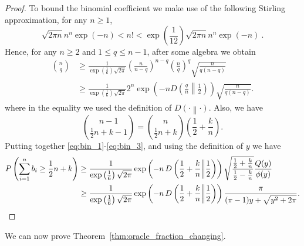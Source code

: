 \begin{proof}
To bound the binomial coefficient we make use of the following Stirling approximation, for any $n\geq 1$,
\[
\sqrt{2 \pi n} n^n \exp(-n) < n! < \exp\left(\frac{1}{12}\right)\sqrt{2 \pi n} n^n \exp(-n)~.
\]
Hence, for any $n \geq 2$ and $1\leq q \leq n-1$, after some algebra we obtain
\begin{align*}
{n \choose q} 
&\geq \frac{1}{\exp\left(\frac{1}{6}\right) \sqrt{2 \pi}} \left(\frac{n}{n-q}\right)^{n-q} \left(\frac{n}{q}\right)^{q} \sqrt{\frac{n}{q(n-q)}} \\
&\geq \frac{1}{\exp\left(\frac{1}{6}\right) \sqrt{2 \pi}} 2^n \exp\left(-n D\left(\frac{q}{n}\middle\|\frac{1}{2}\right)\right) \sqrt{\frac{n}{q(n-q)}}.
\end{align*}
where in the equality we used the definition of $D\left(\cdot\middle\|\cdot\right)$.
Also, we have
\begin{equation}
\label{eq:bin_3}
{n-1 \choose \frac{1}{2} n + k - 1} = {n \choose \frac{1}{2} n + k} \left(\frac{1}{2} + \frac{k}{n}\right) .
\end{equation}
Putting together \eqref{eq:bin_1}-\eqref{eq:bin_3}, and using the definition of $y$ we have
\begin{align*}
P\left( \sum_{i=1}^n b_i \geq \frac{1}{2} n + k \right) 
&\geq \frac{1}{\exp\left(\frac{1}{6}\right) \sqrt{2 \pi}} \exp\left(-n\, D\left(\frac{1}{2}+\frac{k}{n}\middle\|\frac{1}{2}\right)\right) \sqrt{\frac{\frac{1}{2} + \frac{k}{n}}{\frac{1}{2}-\frac{k}{n}}}  \frac{Q(y)}{\phi(y)} \\
&\geq \frac{1}{\exp\left(\frac{1}{6}\right) \sqrt{2 \pi}} \exp\left(-n\, D\left(\frac{1}{2}+\frac{k}{n}\middle\|\frac{1}{2}\right)\right) \frac{\pi}{(\pi-1)y+\sqrt{y^2+2 \pi}}. \qedhere
\end{align*}
\end{proof}

We can now prove Theorem~\ref{thm:oracle_fraction_changing}.

